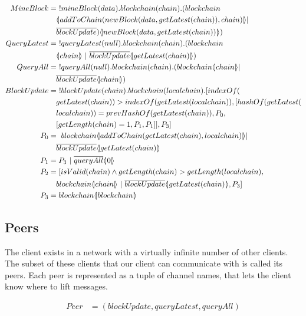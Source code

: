 \begin{align*}
    MineBlock &=\ !mineBlock(data).blockchain(chain).(blockchain\\
        &\quad \lift{}{addToChain(newBlock(data,getLatest(chain)),chain)}|\\
        &\quad \overline{blockUpdate})\lift{}{newBlock(data, getLatest(chain))})\\
    QueryLatest &=\ !queryLatest(null).blockchain(chain).(blockchain\\
        &\quad \lift{}{chain}\ |\ \overline{blockUpdate}\lift{}{getLatest(chain)})\\
        QueryAll &=\ !queryAll(null).blockchain(chain).(blockchain\lift{}{chain}|\\
        &\quad \overline{blockUpdate}\lift{}{chain})\\
    BlockUpdate &=\ !blockUpdate(chain).blockchain(localchain).[indexOf(\\
        &\quad getLatest(chain))>indexOf(getLatest(localchain)),[hashOf(getLatest(\\
        &\quad localchain))=prevHashOf(getLatest(chain)),P_0,\\
        &\quad [getLength(chain)=1,P_1,P_1]],P_3]\\
    P_0 &=\ blockchain\lift{}{addToChain(getLatest(chain),localchain)}|\\
        &\quad \overline{blockUpdate}\lift{}{getLatest(chain)}\\
    P_1 &= P_3\ |\ \overline{queryAll}\lift{}{0}\\
    P_2 &= [isValid(chain) \land getLength(chain) > getLength(localchain),\\
        &\quad blockchain\lift{}{chain}\ |\ \overline{blockUpdate}\lift{}{getLatest(chain)},P_3]\\
    P_3 &= blockchain\lift{}{blockchain}
\end{align*}

\subsection{Peers}
The client exists in a network with a virtually infinite number of other clients.
The subset of these clients that our client can communicate with is called its peers.
Each peer is represented as a tuple of channel names, that lets the client know where to lift messages.

\begin{align*}
    Peer &= (blockUpdate, queryLatest, queryAll)
\end{align*}

